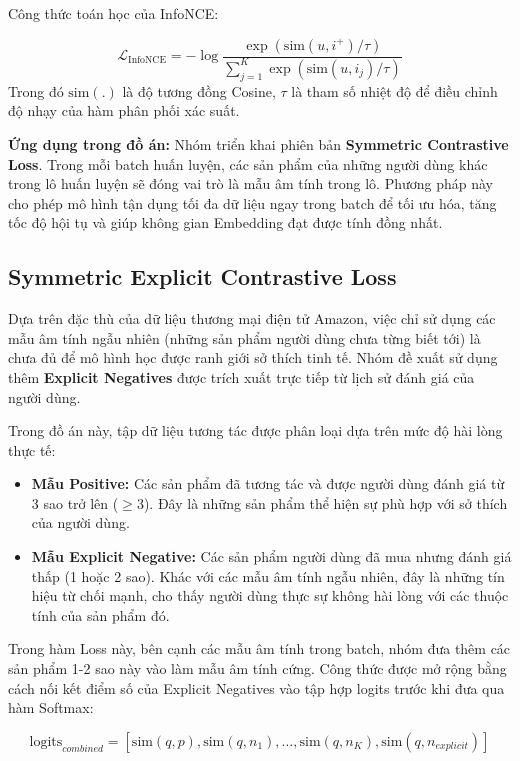 Công thức toán học của InfoNCE:

\begin{equation}
    \mathcal{L}_{\text{InfoNCE}} = - \log \frac{\exp(\text{sim}(u, i^+) / \tau)}{\sum_{j=1}^{K} \exp(\text{sim}(u, i_j) / \tau)} \label{eq:infoNCE}
\end{equation}
Trong đó $\mathrm{sim}(.)$ là độ tương đồng Cosine, $\tau$ là tham số nhiệt độ để điều chỉnh độ nhạy của hàm phân phối xác suất.

\textbf{Ứng dụng trong đồ án:} Nhóm triển khai phiên bản \textbf{Symmetric Contrastive Loss}. Trong mỗi batch huấn luyện, các sản phẩm của những người dùng khác trong lô huấn luyện sẽ đóng vai trò là mẫu âm tính trong lô. Phương pháp này cho phép mô hình tận dụng tối đa dữ liệu ngay trong batch để tối ưu hóa, tăng tốc độ hội tụ và giúp không gian Embedding đạt được tính đồng nhất.

\subsection{Symmetric Explicit Contrastive Loss}

Dựa trên đặc thù của dữ liệu thương mại điện tử Amazon, việc chỉ sử dụng các mẫu âm tính ngẫu nhiên (những sản phẩm người dùng chưa từng biết tới) là chưa đủ để mô hình học được ranh giới sở thích tinh tế. Nhóm đề xuất sử dụng thêm \textbf{Explicit Negatives} được trích xuất trực tiếp từ lịch sử đánh giá của người dùng.

Trong đồ án này, tập dữ liệu tương tác được phân loại dựa trên mức độ hài lòng thực tế:
\begin{itemize}
    \item \textbf{Mẫu Positive:} Các sản phẩm đã tương tác và được người dùng đánh giá từ 3 sao trở lên ($\ge 3$). Đây là những sản phẩm thể hiện sự phù hợp với sở thích của người dùng.
    \item \textbf{Mẫu Explicit Negative:} Các sản phẩm người dùng đã mua nhưng đánh giá thấp (1 hoặc 2 sao). Khác với các mẫu âm tính ngẫu nhiên, đây là những tín hiệu từ chối mạnh, cho thấy người dùng thực sự không hài lòng với các thuộc tính của sản phẩm đó.
\end{itemize}

Trong hàm Loss này, bên cạnh các mẫu âm tính trong batch, nhóm đưa thêm các sản phẩm 1-2 sao này vào làm mẫu âm tính cứng. Công thức được mở rộng bằng cách nối kết điểm số của Explicit Negatives vào tập hợp logits trước khi đưa qua hàm Softmax:

\begin{equation}
    \text{logits}_{combined} = [\text{sim}(q, p), \text{sim}(q, n_1), \dots, \text{sim}(q, n_K), \text{sim}(q, n_{explicit})]
\end{equation}

